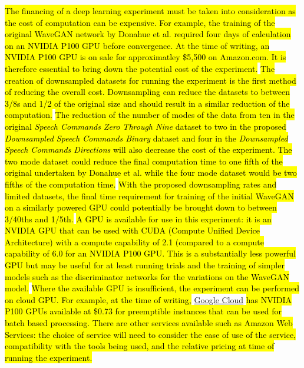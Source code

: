 \documentclass[titlepage]{article}
\begin{document}
\hl{
  The financing of a deep learning experiment must be taken into consideration as the cost of computation can be expensive.
  For example, the training of the original WaveGAN network by Donahue et al. required four days of calculation on an NVIDIA P100 GPU before convergence.
  At the time of writing, an NVIDIA P100 GPU is on sale for approximatley \$5,500 on Amazon.com.
  It is therefore essential to bring down the potential cost of the experiment.
}
\newline
\newline
\hl{
  The creation of downsampled datasets for running the experiment is the first method of reducing the overall cost.
  Downsampling can reduce the datasets to between 3/8s and 1/2 of the original size and should result in a similar reduction of the computation.
}
\newline
\newline
\hl{
  The reduction of the number of modes of the data from ten in the original \textit{Speech Commands Zero Through Nine} dataset to two in the proposed \textit{Downsampled Speech Commands Binary} dataset and four in the \textit{Downsampled Speech Commands Directions} will also decrease the cost of the experiment.
  The two mode dataset could reduce the final computation time to one fifth of the original undertaken by Donahue et al. while the four mode dataset would be two fifths of the computation time.
}
\newline
\newline
\hl{
  With the proposed downsampling rates and limited datasets, the final time requirement for training of the initial WaveGAN on a similarly powered GPU could potentially be brought down to between 3/40ths and 1/5th.
}
\newline
\newline
\hl{
  A GPU is available for use in this experiment: it is an NVIDIA GPU that can be used with CUDA (Compute Unified Device Architecture) with a compute capability of 2.1 (compared to a compute capability of 6.0 for an NVIDIA P100 GPU.
  This is a substantially less powerful GPU but may be useful for at least running trials and the training of simpler models such as the discriminator networks for the variations on the WaveGAN model.
}
\newline
\newline
\hl{
  Where the available GPU is insufficient, the experiment can be performed on cloud GPU.
  For example, at the time of writing,} \href{https://cloud.google.com/gpu/}{Google Cloud} \hl{has NVIDIA P100 GPUs available at \$0.73 for preemptible instances that can be used for batch based processing.
  There are other services available such as Amazon Web Services: the choice of service will need to consider the ease of use of the service, compatibility with the tools being used, and the relative pricing at time of running the experiment.
}
\end{document}
